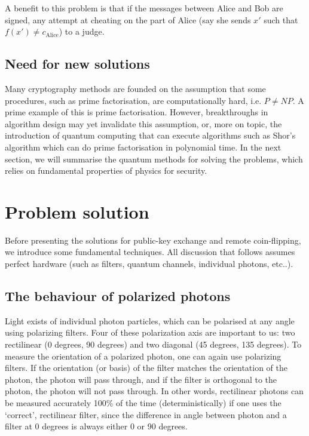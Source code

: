\documentclass[oneside,a4paper]{article}
\begin{document}
A benefit to this problem is that if the messages between Alice and Bob are signed, any attempt at cheating on the part of Alice (say she sends $x'$ such that $f(x') \neq c_{\text{Alice}}$) to a judge.


\subsection{Need for new solutions}
Many cryptography methods are founded on the assumption that some procedures, such as prime factorisation, are computationally hard, i.e. $P \neq NP$.
A prime example of this is prime factorisation.
However, breakthroughs in algorithm design may yet invalidate this assumption, or, more on topic, the introduction of quantum computing that can execute algorithms such as Shor's algorithm which can do prime factorisation in polynomial time.
In the next section, we will summarise the quantum methods for solving the problems, which relies on fundamental properties of physics for security.

\section{Problem solution}
Before presenting the solutions for public-key exchange and remote coin-flipping, we introduce some fundamental techniques.
All discussion that follows assumes perfect hardware (such as filters, quantum channels, individual photons, etc..).

\subsection{The behaviour of polarized photons}
Light exists of individual photon particles, which can be polarised at any angle using polarizing filters.
Four of these polarization axis are important to us: two rectilinear (0 degrees, 90 degrees) and two diagonal (45 degrees, 135 degrees).
To measure the orientation of a polarized photon, one can again use polarizing filters.
If the orientation (or basis) of the filter matches the orientation of the photon, the photon will pass through, and if the filter is orthogonal to the photon, the photon will not pass through.
In other words, rectilinear photons can be measured accurately 100\% of the time (deterministically) if one uses the `correct', rectilinear filter, since the difference in angle between photon and a filter at 0 degrees is always either 0 or 90 degrees.
\end{document}
